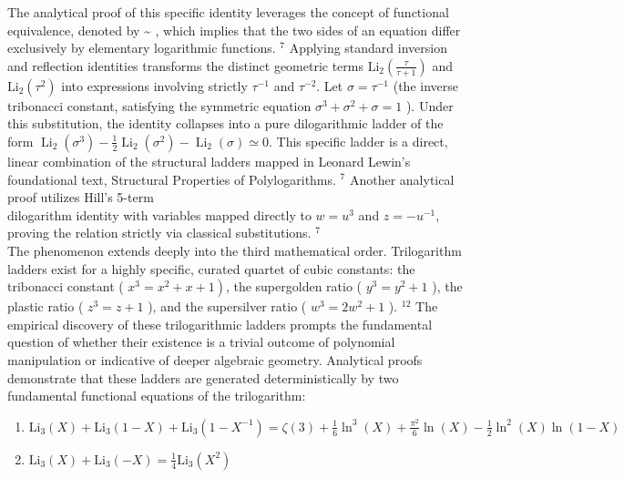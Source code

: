 \documentclass[10pt]{article}
\begin{document}
The analytical proof of this specific identity leverages the concept of functional equivalence, denoted by \~{} , which implies that the two sides of an equation differ exclusively by elementary logarithmic functions. ${ }^{7}$ Applying standard inversion and reflection identities transforms the distinct geometric terms $\mathrm{Li}_{2}\left(\frac{\tau}{\tau+1}\right)$ and $\mathrm{Li}_{2}\left(\tau^{2}\right)$ into expressions involving strictly $\tau^{-1}$ and $\tau^{-2}$. Let $\sigma=\tau^{-1}$ (the inverse tribonacci constant, satisfying the symmetric equation $\sigma^{3}+\sigma^{2}+\sigma=1$ ). Under this substitution, the identity collapses into a pure dilogarithmic ladder of the form $\operatorname{Li}_{2}\left(\sigma^{3}\right)-\frac{1}{2} \operatorname{Li}_{2}\left(\sigma^{2}\right)-\operatorname{Li}_{2}(\sigma) \simeq 0$. This specific ladder is a direct, linear combination of the structural ladders mapped in Leonard Lewin's foundational text, Structural Properties of Polylogarithms. ${ }^{7}$ Another analytical proof utilizes Hill's 5-term\\
dilogarithm identity with variables mapped directly to $w=u^{3}$ and $z=-u^{-1}$, proving the relation strictly via classical substitutions. ${ }^{7}$\\
The phenomenon extends deeply into the third mathematical order. Trilogarithm ladders exist for a highly specific, curated quartet of cubic constants: the tribonacci constant ( $\left.x^{3}=x^{2}+x+1\right)$, the supergolden ratio ( $y^{3}=y^{2}+1$ ), the plastic ratio ( $z^{3}=z+1$ ), and the supersilver ratio ( $w^{3}=2 w^{2}+1$ ). ${ }^{12}$ The empirical discovery of these trilogarithmic ladders prompts the fundamental question of whether their existence is a trivial outcome of polynomial manipulation or indicative of deeper algebraic geometry. Analytical proofs demonstrate that these ladders are generated deterministically by two fundamental functional equations of the trilogarithm:

\begin{enumerate}
  \item $\mathrm{Li}_{3}(X)+\mathrm{Li}_{3}(1-X)+\mathrm{Li}_{3}\left(1-X^{-1}\right)=\zeta(3)+\frac{1}{6} \ln ^{3}(X)+\frac{\pi^{2}}{6} \ln (X)-\frac{1}{2} \ln ^{2}(X) \ln (1-X)$
  \item $\mathrm{Li}_{3}(X)+\mathrm{Li}_{3}(-X)=\frac{1}{4} \mathrm{Li}_{3}\left(X^{2}\right)$
\end{enumerate}
\end{document}
